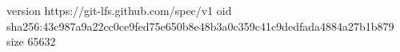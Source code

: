 version https://git-lfs.github.com/spec/v1
oid sha256:43c987a9a22cc0ce9fed75e650b8e48b3a0c359c41c9dedfada4884a27b1b879
size 65632
